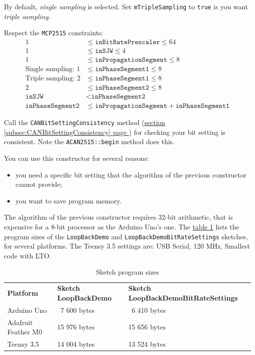\documentclass[9pt, a4paper, obeyspaces]{extarticle}
\newcommand\refSubsectionPage[1]{\hyperref[subsec:#1]{section \ref*{subsec:#1} page \pageref{subsec:#1}}}
\newcommand\labelTableau[1]{\label{tab:#1}}
\newcommand\refTableau[1]{\hyperref[tab:#1]{table \ref*{tab:#1}}}
\begin{document}
By default, \emph{single sampling} is selected. Set \texttt{mTripleSampling} to \texttt{true} is you want \emph{triple sampling}.

Respect the \texttt{MCP2515} constraints:
\begin{align*}
1 & \leqslant \texttt{inBitRatePrescaler} \leqslant 64 \\
1 & \leqslant \texttt{inSJW} \leqslant 4 \\
1 & \leqslant \texttt{inPropagationSegment} \leqslant 8 \\
\text{Single sampling: }1 & \leqslant \texttt{inPhaseSegment1} \leqslant 8\\
\text{Triple sampling: }2 & \leqslant \texttt{inPhaseSegment1} \leqslant 8\\
2 & \leqslant \texttt{inPhaseSegment2} \leqslant 8 \\
\texttt{inSJW} &<\texttt{inPhaseSegment2}\\
\texttt{inPhaseSegment2} & \leqslant \texttt{inPropagationSegment} + \texttt{inPhaseSegment1}
\end{align*}

Call the \texttt{CANBitSettingConsistency} method (\refSubsectionPage{CANBitSettingConsistency}) for checking your bit setting is consistent. Note the \texttt{ACAN2515::begin} method does this.

You can use this constructor for several reasons:
\begin{itemize}
  \item you need a specific bit setting that the algorithm of the previous constructor cannot provide;
  \item you want to save program memory.
\end{itemize}

The algorithm of the previous constructor requires 32-bit arithmetic, that is expensive for a 8-bit processor as the Arduino Uno's one. The \refTableau{sketchSizes} lists the program sizes of the \texttt{LoopBackDemo} and \texttt{LoopBackDemoBitRateSettings} sketches, for several platforms. The Teensy 3.5 settings are: USB Serial, 120 MHz, Smallest code with LTO.

\begin{table}[!ht]
  \small
  \onehalfspacing
  \centering
  \begin{tabular}{lll}
    \textbf{Platform} & \textbf{Sketch LoopBackDemo} & \textbf{Sketch LoopBackDemoBitRateSettings}\\
    Arduino Uno & ~7 600 bytes & ~6 410 bytes\\
    Adafruit Feather M0 & 15 976 bytes & 15 656 bytes\\
    Teensy 3.5 & 14 004 bytes & 13 524 bytes\\
  \end{tabular}
  \caption{Sketch program sizes}
  \labelTableau{sketchSizes}
\end{table}
\end{document}
